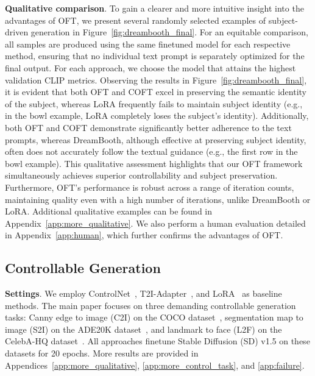 \textbf{Qualitative comparison}. To gain a clearer and more intuitive insight into the advantages of OFT, we present several randomly selected examples of subject-driven generation in Figure~\ref{fig:dreambooth_final}. For an equitable comparison, all samples are produced using the same finetuned model for each respective method, ensuring that no individual text prompt is separately optimized for the final output. For each approach, we choose the model that attains the highest validation CLIP metrics. Observing the results in Figure~\ref{fig:dreambooth_final}, it is evident that both OFT and COFT excel in preserving the semantic identity of the subject, whereas LoRA frequently fails to maintain subject identity (e.g., in the bowl example, LoRA completely loses the subject’s identity). Additionally, both OFT and COFT demonstrate significantly better adherence to the text prompts, whereas DreamBooth, although effective at preserving subject identity, often does not accurately follow the textual guidance (e.g., the first row in the bowl example). This qualitative assessment highlights that our OFT framework simultaneously achieves superior controllability and subject preservation. Furthermore, OFT’s performance is robust across a range of iteration counts, maintaining quality even with a high number of iterations, unlike DreamBooth or LoRA. Additional qualitative examples can be found in Appendix~\ref{app:more_qualitative}. We also perform a human evaluation detailed in Appendix~\ref{app:human}, which further confirms the advantages of OFT.

\subsection{Controllable Generation}

\textbf{Settings}. We employ ControlNet~\cite{zhang2023adding}, T2I-Adapter~\cite{mou2023t2i}, and LoRA~\cite{hulora2022} as baseline methods. The main paper focuses on three demanding controllable generation tasks: Canny edge to image (C2I) on the COCO dataset~\cite{lin2014microsoft}, segmentation map to image (S2I) on the ADE20K dataset~\cite{zhou2017scene}, and landmark to face (L2F) on the CelebA-HQ dataset~\cite{karras2018progressive,xia2021tedigan}. All approaches finetune Stable Diffusion (SD) v1.5 on these datasets for 20 epochs. More results are provided in Appendices~\ref{app:more_qualitative}, \ref{app:more_control_task}, and \ref{app:failure}.

